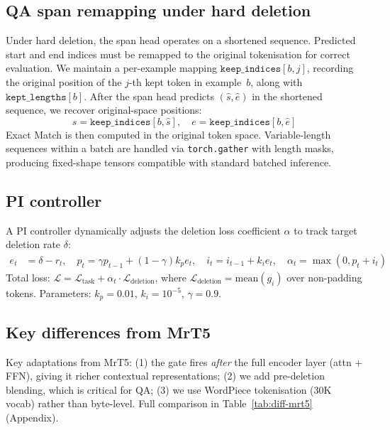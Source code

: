 \documentclass{article} %
\begin{document}
\subsection{QA span remapping under hard deletion}
\label{sec:span-remapping}

Under hard deletion, the span head operates on a shortened sequence. Predicted start and end indices must be remapped to the original tokenisation for correct evaluation. We maintain a per-example mapping $\texttt{keep\_indices}[b,j]$, recording the original position of the $j$-th kept token in example~$b$, along with $\texttt{kept\_lengths}[b]$. After the span head predicts $(\hat{s},\hat{e})$ in the shortened sequence, we recover original-space positions:
\begin{equation}
    s = \texttt{keep\_indices}[b,\hat{s}], \quad e = \texttt{keep\_indices}[b,\hat{e}]
    \label{eq:span-remap}
\end{equation}
Exact Match is then computed in the original token space. Variable-length sequences within a batch are handled via \texttt{torch.gather} with length masks, producing fixed-shape tensors compatible with standard batched inference.


\subsection{PI controller}
\label{sec:pi-controller}

A PI controller dynamically adjusts the deletion loss coefficient $\alpha$ to track target deletion rate $\delta$:
\begin{align}
    e_t &= \delta - r_t, \quad
    p_t = \gamma p_{t-1} + (1-\gamma)k_p e_t, \quad
    i_t = i_{t-1} + k_i e_t, \quad
    \alpha_t = \max(0, p_t+i_t)
\end{align}
Total loss: $\mathcal{L} = \mathcal{L}_{\text{task}} + \alpha_t\cdot\mathcal{L}_{\text{deletion}}$, where $\mathcal{L}_{\text{deletion}} = \text{mean}(g_i)$ over non-padding tokens. Parameters: $k_p=0.01$, $k_i=10^{-5}$, $\gamma=0.9$.


\subsection{Key differences from MrT5}

Key adaptations from MrT5: (1) the gate fires \emph{after} the full encoder layer (attn + FFN), giving it richer contextual representations; (2) we add pre-deletion blending, which is critical for QA; (3) we use WordPiece tokenisation (30K vocab) rather than byte-level. Full comparison in Table~\ref{tab:diff-mrt5} (Appendix).
\end{document}
